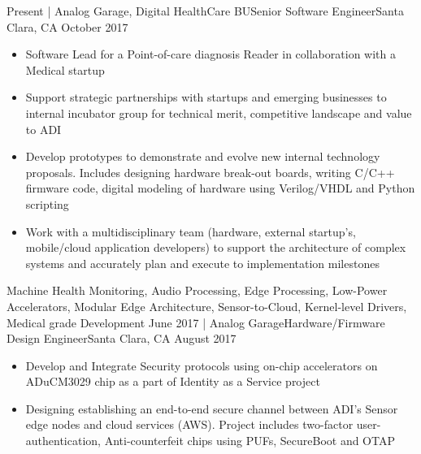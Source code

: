 %
%
%

\begin{experiences}
  \experience
    {Present}   {| Analog Garage, Digital HealthCare BU}{Senior Software Engineer}{Santa Clara, CA}
    {October 2017} {
                      \begin{itemize}
                        \item Software Lead for a Point-of-care diagnosis Reader in collaboration with a Medical startup
                        \item Support strategic partnerships with startups and emerging businesses to internal incubator group for technical merit, competitive landscape and value to ADI
                        \item Develop prototypes to demonstrate and evolve new internal technology proposals. Includes designing hardware break-out boards, writing C/C++ firmware code, digital modeling of hardware using Verilog/VHDL and Python scripting
                        \item Work with a multidisciplinary team (hardware, external startup’s, mobile/cloud application developers) to support the architecture of complex systems and accurately plan and execute to implementation milestones\\
                      \end{itemize}
                    }
                    {Machine Health Monitoring, Audio Processing, Edge Processing, Low-Power Accelerators, Modular Edge Architecture, Sensor-to-Cloud, Kernel-level Drivers, Medical grade Development}
  \emptySeparator
  \experience
    {June 2017}       {| Analog Garage}{Hardware/Firmware Design Engineer}{Santa Clara, CA}
    {August 2017}    {
                      \begin{itemize}
                        \item Develop and Integrate Security protocols using on-chip accelerators on ADuCM3029 chip as a part of Identity as a Service project
                        \item Designing establishing an end-to-end secure channel between ADI's Sensor edge nodes and cloud services (AWS). Project includes two-factor user-authentication, Anti-counterfeit chips using PUFs, SecureBoot and OTAP \\

\end{itemize}}
\end{experiences}
